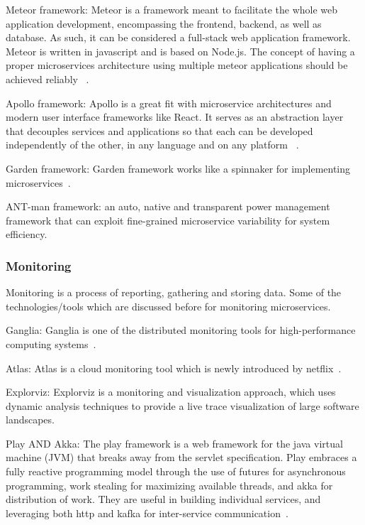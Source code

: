 \par Meteor framework: Meteor is a framework meant to facilitate the whole web application development, encompassing the frontend, backend, as well as database. As such, it can be considered a full-stack web application framework. Meteor is written in javascript and is based on Node.js. The concept of having a proper microservices architecture using multiple meteor applications should be achieved reliably ~\cite{Tuuli2020}.


\par Apollo framework: Apollo is a great fit with microservice architectures and modern user interface frameworks like React. It serves as an abstraction layer that decouples services and applications so that each can be developed independently of the other, in any language and on any platform ~\cite{Kevin2015}.

\par Garden framework: Garden framework works like a spinnaker for implementing microservices~\cite{Ellen2018}.

\par ANT-man framework: an auto, native and transparent power management framework that can exploit fine-grained microservice variability for system efficiency\cite{Hou2020}.


\subsubsection{Monitoring}
Monitoring is a process of reporting, gathering and storing data. Some of the technologies/tools which are discussed before for monitoring microservices. 
\par Ganglia: Ganglia is one of the distributed monitoring tools for high-performance computing systems~\cite{Kristiani2020}.

\par Atlas: Atlas is a cloud monitoring tool which is newly introduced by netflix~\cite{Netflix}.

\par Explorviz: Explorviz is a monitoring and visualization approach, which uses dynamic analysis techniques to provide a live trace visualization of large software landscapes\cite{Lenga2019}.

\par Play AND Akka: The play framework is a web framework for the java virtual machine (JVM) that breaks away from the servlet specification. Play embraces a fully reactive programming model through the use of futures for asynchronous programming, work stealing for maximizing available threads, and akka for distribution of work. They are useful in building individual services, and leveraging both http and kafka for inter-service communication~\cite{khan2017}.

